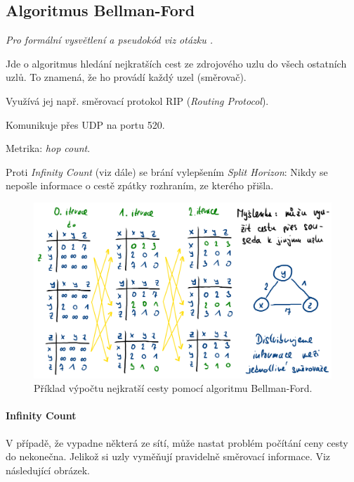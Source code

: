 \subsection{Algoritmus Bellman-Ford}

\begin{compactitem}
    \item \textit{Pro formální vysvětlení a pseudokód viz otázku .}
    \item Jde o algoritmus hledání nejkratších cest ze zdrojového uzlu do všech ostatních uzlů. To znamená, že ho provádí každý uzel (směrovač).
    \item Využívá jej např. směrovací protokol RIP (\textit{Routing Protocol}). \begin{compactitem}
        \item Komunikuje přes UDP na portu 520.
        \item Metrika: \textit{hop count}.
        \item Proti \textit{Infinity Count} (viz dále) se brání vylepšením \textit{Split Horizon}: Nikdy se nepošle informace o cestě zpátky rozhraním, ze kterého přišla.
    \end{compactitem}
\end{compactitem}

\begin{figure}[H]
    \centering
    \includegraphics[width=1\linewidth]{bellman_ford_example.pdf}
    \caption{Příklad výpočtu nejkratší cesty pomocí algoritmu Bellman-Ford.}
\end{figure}

\paragraph*{Infinity Count} V případě, že vypadne některá ze sítí, může nastat problém počítání ceny cesty do nekonečna. Jelikož si uzly vyměňují pravidelně směrovací informace. Viz následující obrázek.

